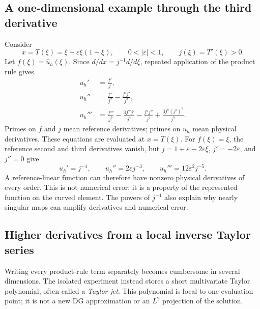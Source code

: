 \subsection{A one-dimensional example through the third derivative}
Consider
\begin{equation}
 x=T(\xi)=\xi+\varepsilon\xi(1-\xi),\qquad
 0<|\varepsilon|<1,\qquad j(\xi)=T'(\xi)>0.
\end{equation}
Let $f(\xi)=\widehat u_h(\xi)$. Since $d/dx=j^{-1}d/d\xi$,
repeated application of the product rule gives
\begin{align}
 u_h'&=\frac{f'}{j},\\
 u_h''&=\frac{f''}{j^2}-\frac{f'j'}{j^3},\\
 u_h'''&=\frac{f'''}{j^3}
 -\frac{3f''j'}{j^4}-\frac{f'j''}{j^4}
 +\frac{3f'(j')^2}{j^5}.
 \label{eq:app-third-one-dimensional}
\end{align}
Primes on $f$ and $j$ mean reference derivatives; primes on $u_h$ mean
physical derivatives. These equations are evaluated at $x=T(\xi)$.
For $f(\xi)=\xi$, the reference second and third derivatives vanish, but
$j=1+\varepsilon-2\varepsilon\xi$, $j'=-2\varepsilon$, and $j''=0$ give
\begin{equation}
 u_h'=j^{-1},\qquad
 u_h''=2\varepsilon j^{-3},\qquad
 u_h'''=12\varepsilon^2j^{-5}.
\end{equation}
A reference-linear function can therefore have nonzero physical derivatives
of every order. This is not numerical error: it is a property of the
represented function on the curved element. The powers of $j^{-1}$ also
explain why nearly singular maps can amplify derivatives and numerical error.

\subsection{Higher derivatives from a local inverse Taylor series}
\label{sec:appendix-jets}
Writing every product-rule term separately becomes cumbersome in several
dimensions. The isolated experiment instead stores a short multivariate
Taylor polynomial, often called a \emph{Taylor jet}. This polynomial is
local to one evaluation point; it is not a new DG approximation or an
$L^2$ projection of the solution.

